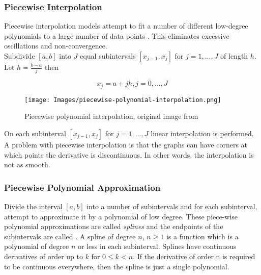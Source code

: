 \subsubsection{Piecewise Interpolation}

Piecewise interpolation models attempt to fit a number of different low-degree polynomials to a large number of data points \cite{intro-to-numerical-analysis-atkinson}. This eliminates excessive oscillations and non-convergence.\\

Subdivide $[a, b]$ into $J$ equal subintervals $[x_{j-1}, x_j]$ for $j = 1, ..., J$ of length $h$. Let $h = \frac{b-a}{j}$ then 

\begin{equation}
    x_j = a + jh, j = 0, ..., J
\end{equation}

\begin{figure}[H]
\begin{center}
    \texttt{[image: Images/piecewise-polynomial-interpolation.png]}
    \caption{Piecewise polynomial interpolation, original image from \cite{m2aa3-notes}}
    \label{fig:piecewise-polynomial-interpolation}
\end{center}
\end{figure}

On each subinterval $[x_{j-1}, x_j]$ for $j = 1,...,J$ linear interpolation is performed. \\

A problem with piecewise interpolation is that the graphs can have corners at which points the derivative is discontinuous. In other words, the interpolation is not as smooth.

\subsubsection{Piecewise Polynomial Approximation}

Divide the interval $[a,b]$ into a number of subintervals and for each subinterval, attempt to approximate it by a polynomial of low degree. These piece-wise polynomial approximations are called \textit{splines} and the endpoints of the subintervals are called \cite{intro-to-numerical-analysis-suli}. A spline of degree $n$, $n \geq 1$ is a function which is a polynomial of degree $n$ or less in each subinterval. Splines have continuous derivatives of order up to $k$ for $0 \leq k < n$. If the derivative of order n is required to be continuous everywhere, then the spline is just a single polynomial. \\

